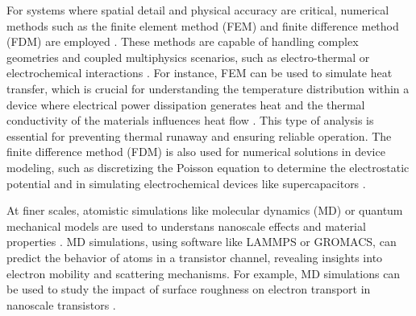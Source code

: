For systems where spatial detail and physical accuracy are critical, numerical methods such as the finite element method (FEM) and finite difference method (FDM) are employed \citep{jagotaFinite2013,moghadamDesign2013}. These methods are capable of handling complex geometries and coupled multiphysics scenarios, such as electro-thermal or electrochemical interactions \citep{jagotaFinite2013,drummondLoworder2015}. For instance, FEM can be used to simulate heat transfer, which is crucial for understanding the temperature distribution within a device where electrical power dissipation generates heat and the thermal conductivity of the materials influences heat flow \citep{jagotaFinite2013}. This type of analysis is essential for preventing thermal runaway and ensuring reliable operation. The finite difference method (FDM) is also used for numerical solutions in device modeling, such as discretizing the Poisson equation to determine the electrostatic potential and in simulating electrochemical devices like supercapacitors \citep{moghadamDesign2013,drummondLoworder2015}. 

At finer scales, atomistic simulations like molecular dynamics (MD) or quantum mechanical models are used to understans nanoscale effects and material properties \citep{hayatiCNTMOSFET2010}. MD simulations, using software like LAMMPS or GROMACS, can predict the behavior of atoms in a transistor channel, revealing insights into electron mobility and scattering mechanisms. For example, MD simulations can be used to study the impact of surface roughness on electron transport in nanoscale transistors \citep{zhaoUnderstanding2018}.

